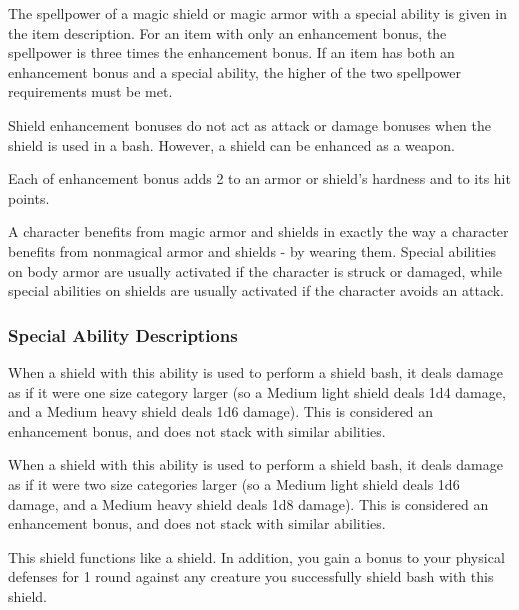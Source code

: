  The spellpower of a magic shield or magic armor with a special ability is given in the item description.
For an item with only an enhancement bonus, the spellpower is three times the enhancement bonus.
If an item has both an enhancement bonus and a special ability, the higher of the two spellpower requirements must be met.

 Shield enhancement bonuses do not act as attack or damage bonuses when the shield is used in a bash.
However, a shield can be enhanced as a weapon.

 Each  of enhancement bonus adds 2 to an armor or shield's hardness and  to its hit points.

 A character benefits from magic armor and shields in exactly the way a character benefits from nonmagical armor and shields - by wearing them.
Special abilities on body armor are usually activated if the character is struck or damaged, while special abilities on shields are usually activated if the character avoids an attack.

\subsubsection{Special Ability Descriptions}

 When a shield with this ability is used to perform a shield bash, it deals damage as if it were one size category larger (so a Medium light shield deals 1d4 damage, and a Medium heavy shield deals 1d6 damage).
This is considered an enhancement bonus, and does not stack with similar abilities.


 When a shield with this ability is used to perform a shield bash, it deals damage as if it were two size categories larger (so a Medium light shield deals 1d6 damage, and a Medium heavy shield deals 1d8 damage).
This is considered an enhancement bonus, and does not stack with similar abilities.


 This shield functions like a  shield.
In addition, you gain a  bonus to your physical defenses for 1 round against any creature you successfully shield bash with this shield.

